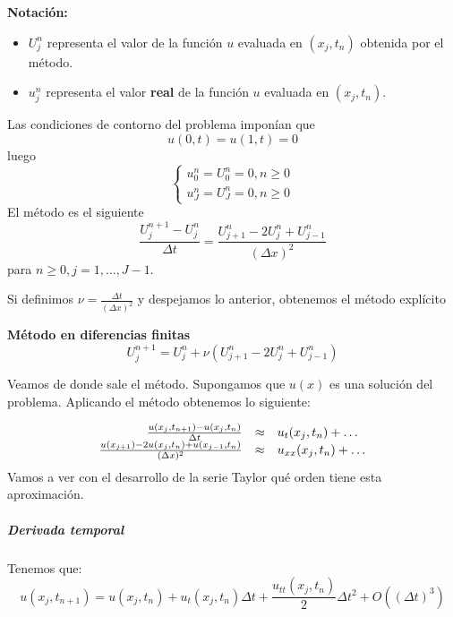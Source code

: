 \begin{mdframed}
	\textbf{Notación:}
	\begin{itemize}
		\vspace{-3mm}
	\item $U_j^n$ representa el valor de la función $u$ evaluada en $(x_j,t_n)$ obtenida por el método.
	\item $u_j^n$ representa el valor \textbf{real} de la función $u$ evaluada en $(x_j,t_n)$.
	\end{itemize}
\end{mdframed}

Las condiciones de contorno del problema imponían que 
$$u(0,t) = u(1,t) = 0$$
luego
\begin{equation*}
	\left\{
	\begin{array}{l}
	u_0^n = U_0^n = 0, n\ge 0\\
	u_J^n = U_J^n = 0, n\ge 0
	\end{array}
	\right.
\end{equation*}
El método es el siguiente
\begin{equation*}
	\frac{U_j^{n+1}-U_j^n}{\Delta t} =  \frac{U_{j+1}^n-2U_j^n+U_{j-1}^n}{(\Delta x)^2}
\end{equation*}
para $n\ge  0, j=1,\hdots ,J-1$.

\noindent Si definimos
$\nu = \frac{\Delta t}{(\Delta x )^2}$ y despejamos lo anterior, obtenemos el método explícito
\begin{mdframed}
	\textbf{Método en diferencias finitas}
	$$U_j^{n+1} = U_j^n+\nu\left(U_{j+1}^n - 2 U_j^n + U_{j-1}^n\right)$$
\end{mdframed}
Veamos de donde sale el método. Supongamos que $u(x)$ es una solución del problema. Aplicando el método obtenemos lo siguiente: 

\begin{equation*}
	\begin{array}{r l l}
	\frac{u(x_j, t_{n+1})-u(x_j,t_n)}{\Delta t} &\approx& u_t(x_j, t_n) + \hdots\\
	\frac{u(x_{j+1}) - 2u(x_j, t_n) + u(x_{j-1}, t_n)}{(\Delta x)^2} &\approx& u_{xx}(x_j, t_n) + \hdots
	\end{array}
\end{equation*}
Vamos a ver con el desarrollo de la serie Taylor qué orden tiene esta aproximación.

\subparagraph*{Derivada temporal} 
\mbox{}

Tenemos que:
$$u(x_j, t_{n+1}) = u(x_j, t_n) + u_t(x_j, t_n)\Delta t +\frac{u_{tt} (x_j,t_n)}{2}\Delta t ^2 + O\left((\Delta t)^3\right)$$

